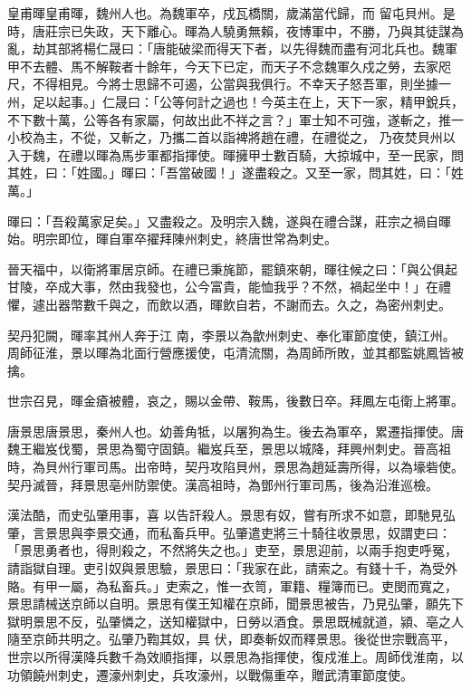 \begin{pinyinscope}
 皇甫暉皇甫暉，魏州人也。為魏軍卒，戍瓦橋關，歲滿當代歸，而
 留屯貝州。是時，唐莊宗已失政，天下離心。暉為人驍勇無賴，夜博軍中，不勝，乃與其徒謀為亂，劫其部將楊仁晟曰：「唐能破梁而得天下者，以先得魏而盡有河北兵也。魏軍甲不去體、馬不解鞍者十餘年，今天下已定，而天子不念魏軍久戍之勞，去家咫尺，不得相見。今將士思歸不可遏，公當與我俱行。不幸天子怒吾軍，則坐據一州，足以起事。」仁晟曰：「公等何計之過也！今英主在上，天下一家，精甲銳兵，不下數十萬，公等各有家屬，何故出此不祥之言？」軍士知不可強，遂斬之，推一小校為主，不從，又斬之，乃攜二首以詣裨將趙在禮，在禮從之，
 乃夜焚貝州以入于魏，在禮以暉為馬步軍都指揮使。暉擁甲士數百騎，大掠城中，至一民家，問其姓，曰：「姓國。」暉曰：「吾當破國！」遂盡殺之。又至一家，問其姓，曰：「姓萬。」



 暉曰：「吾殺萬家足矣。」又盡殺之。及明宗入魏，遂與在禮合謀，莊宗之禍自暉始。明宗即位，暉自軍卒擢拜陳州刺史，終唐世常為刺史。



 晉天福中，以衛將軍居京師。在禮已秉旄節，罷鎮來朝，暉往候之曰：「與公俱起甘陵，卒成大事，然由我發也，公今富貴，能恤我乎？不然，禍起坐中！」在禮懼，遽出器幣數千與之，而飲以酒，暉飲自若，不謝而去。久之，為密州刺史。



 契丹犯闕，暉率其州人奔于江
 南，李景以為歙州刺史、奉化軍節度使，鎮江州。周師征淮，景以暉為北面行營應援使，屯清流關，為周師所敗，並其都監姚鳳皆被擒。



 世宗召見，暉金瘡被體，哀之，賜以金帶、鞍馬，後數日卒。拜鳳左屯衛上將軍。



 唐景思唐景思，秦州人也。幼善角牴，以屠狗為生。後去為軍卒，累遷指揮使。唐魏王繼岌伐蜀，景思為蜀守固鎮。繼岌兵至，景思以城降，拜興州刺史。晉高祖時，為貝州行軍司馬。出帝時，契丹攻陷貝州，景思為趙延壽所得，以為壕砦使。契丹滅晉，拜景思亳州防禦使。漢高祖時，為鄧州行軍司馬，後為沿淮巡檢。



 漢法酷，而史弘肇用事，喜
 以告訐殺人。景思有奴，嘗有所求不如意，即馳見弘肇，言景思與李景交通，而私畜兵甲。弘肇遣吏將三十騎往收景思，奴謂吏曰：「景思勇者也，得則殺之，不然將失之也。」吏至，景思迎前，以兩手抱吏呼冤，請詣獄自理。吏引奴與景思驗，景思曰：「我家在此，請索之。有錢十千，為受外賂。有甲一屬，為私畜兵。」吏索之，惟一衣笥，軍籍、糧簿而已。吏閔而寬之，景思請械送京師以自明。景思有僕王知權在京師，聞景思被告，乃見弘肇，願先下獄明景思不反，弘肇憐之，送知權獄中，日勞以酒食。景思既械就道，潁、亳之人隨至京師共明之。弘肇乃鞫其奴，具
 伏，即奏斬奴而釋景思。後從世宗戰高平，世宗以所得漢降兵數千為效順指揮，以景思為指揮使，復戍淮上。周師伐淮南，以功領饒州刺史，遷濠州刺史，兵攻濠州，以戰傷重卒，贈武清軍節度使。




\end{pinyinscope}
